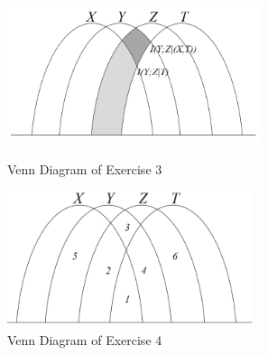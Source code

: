   \begin{figure}[htbp]
    \centering
        \begin{minipage}[t]{0.45\linewidth}
            \centering
            \includegraphics[height=4cm]{img/3-3.png}
            \caption{Venn Diagram of Exercise 3}
            \label{fig:ex3}
        \end{minipage}
        \begin{minipage}[t]{0.45\linewidth}
            \centering
            \includegraphics[height=4cm]{img/3-4.png}
            \caption{Venn Diagram of Exercise 4}
            \label{fig:ex3-4}
        \end{minipage}
  \end{figure}

